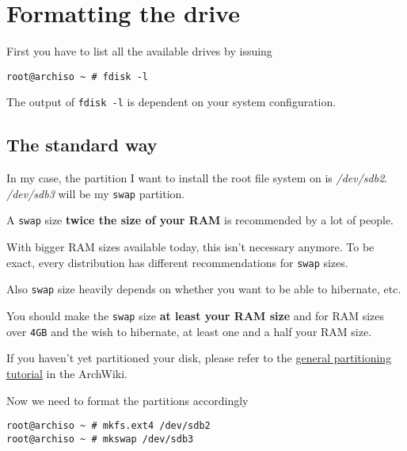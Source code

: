 \documentclass[9pt]{report}
\newenvironment{NOTE}
{\begin{tcolorbox}[colback=admonitionBG,coltitle=draculaFG,colframe=draculaBlue,colbacktitle=draculaBlue,title=NOTE]}
{\end{tcolorbox}}
\newenvironment{IMPORTANT}
{\begin{tcolorbox}[colback=admonitionBG,coltitle=draculaFG,colframe=draculaRed,colbacktitle=draculaRed,title=IMPORTANT]}
{\end{tcolorbox}}
\begin{document}
\newpage

\hypertarget{x-formatting-the-drive}{\section{Formatting the drive}}
First you have to list all the available drives by issuing


\begin{verbatim}
root@archiso ~ # fdisk -l
\end{verbatim}

\begin{NOTE}
    The output of \texttt{fdisk -l} is dependent on your system configuration.
\end{NOTE}

\newpage

\hypertarget{x-the-standard-way}{\subsection{The standard way}}
In my case, the partition I want to install the root file system on is \textit{/dev/sdb2}.
\textit{/dev/sdb3} will be my \texttt{swap} partition.


\begin{NOTE}
    A \texttt{swap} size \textbf{twice the size of your RAM} is recommended by a lot of people.


    With bigger RAM sizes available today, this isn’t necessary anymore.
    To be exact, every distribution has different recommendations for \texttt{swap} sizes.


    Also \texttt{swap} size heavily depends on whether you want to be able to hibernate, etc.


    You should make the \texttt{swap} size \textbf{at least your RAM size} and for RAM sizes over \texttt{4GB} and the wish to hibernate, at least one and a half your RAM size.

\end{NOTE}
\begin{IMPORTANT}
    If you haven’t yet partitioned your disk, please refer to the \href{https://wiki.archlinux.org/index.php/Partitioning}{general partitioning tutorial} in the ArchWiki.

\end{IMPORTANT}
Now we need to format the partitions accordingly


\begin{verbatim}
root@archiso ~ # mkfs.ext4 /dev/sdb2
root@archiso ~ # mkswap /dev/sdb3
\end{verbatim}
\end{document}

